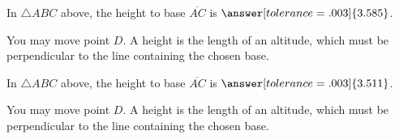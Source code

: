 \documentclass[nooutcomes]{ximera}
\begin{document}
\begin{problem}
\begin{center}  
\end{center}
In $\triangle ABC$ above, the height to base $\overline{AC}$ is $\answer[tolerance=.003]{3.585}$.
\begin{hint}
You may move point $D$.  A height is the length of an altitude, which must be perpendicular to the line containing the chosen base.  
\end{hint}
\end{problem}

\begin{problem}
\begin{center}  
\end{center}
In $\triangle ABC$ above, the height to base $\overline{AC}$ is $\answer[tolerance=.003]{3.511}$.
\begin{hint}
You may move point $D$.  A height is the length of an altitude, which must be perpendicular to the line containing the chosen base.  
\end{hint}
\end{problem}
\end{document}
